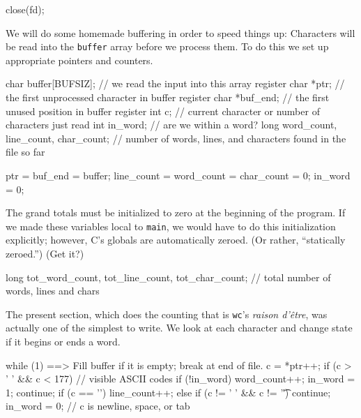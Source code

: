 \documentclass[11pt,a4paper]{article}
\begin{document}
\begin{code}[language=c,name={Close file}]
close(fd);
\end{code}

We will do some homemade buffering in order to speed things up: Characters will be read into the
\texttt{buffer} array before we process them. To do this we set up appropriate pointers and counters.

\begin{code}[language=c,name={Variables local to main}]
char buffer[BUFSIZ];     // we read the input into this array
register char *ptr;      // the first unprocessed character in buffer
register char *buf_end;  // the first unused position in buffer
register int c;          // current character or number of characters just read
int in_word;             // are we within a word?
long word_count, line_count, char_count; // number of words, lines, and characters found in the file so far
\end{code}

\begin{code}[language=c,name={Initialize pointers and counters}]
ptr = buf_end = buffer;
line_count = word_count = char_count = 0;
in_word = 0;
\end{code}

The grand totals must be initialized to zero at the beginning of the program. If we made these
variables local to \texttt{main}, we would have to do this initialization explicitly; however, C's
globals are automatically zeroed. (Or rather, ``statically zeroed.'') (Get it?)

\begin{code}[language=c,name={Global variables}]
long tot_word_count, tot_line_count, tot_char_count; // total number of words, lines and chars
\end{code}

The present section, which does the counting that is \texttt{wc}'s \emph{raison d'\^{e}tre}, was
actually one of the simplest to write. We look at each character and change state if it begins or
ends a word.

\begin{code}[language=c,name={Scan file}]
while (1) {
    ==> Fill buffer if it is empty; break at end of file.
    c = *ptr++;
    if (c > ' ' && c < 177) {    // visible ASCII codes
        if (!in_word) {
            word_count++;
            in_word = 1;
        }
        continue;
    }
    if (c == '\n') line_count++;
    else if (c != ' ' && c != '\t') continue;
    in_word = 0;  // c is newline, space, or tab
}
\end{code}
\end{document}
